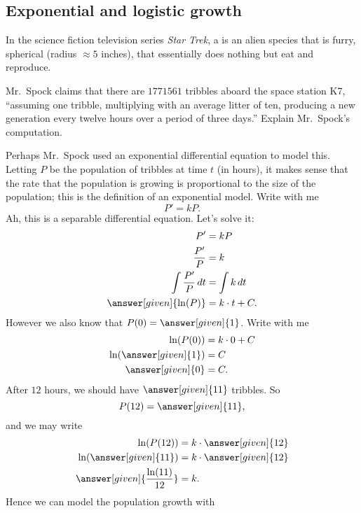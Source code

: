 \documentclass{ximera}
\begin{document}
\subsection{Exponential and logistic growth}

In the science fiction television series \textit{Star
  Trek}, a  is an alien species that is furry, spherical
(radius $\approx 5$ inches), that essentially does nothing but eat and
reproduce. 

\begin{example}
  Mr.\ Spock claims that there are $1771561$ tribbles aboard the space
  station K7, ``assuming one tribble, multiplying with an average
  litter of ten, producing a new generation every twelve hours over a
  period of three days.'' Explain Mr.\ Spock's computation.
  \begin{explanation}
    Perhaps Mr.\ Spock used an exponential differential equation to
    model this.  Letting $P$ be the population of tribbles at time $t$
    (in hours), it makes sense that the rate that the population is
    growing is proportional to the size of the population; this is the
    definition of an exponential model. Write with me
    \[
    P' = k P.
    \]
    Ah, this is a separable differential equation. Let's solve it:
    \begin{align*}
      P' &= k P\\
      \frac{P'}{P} &= k\\
      \int \frac{P'}{P} \d t &= \int k\d t\\
      \answer[given]{\ln(P)} &= k\cdot t + C.
    \end{align*}
    However we also know that $P(0) = \answer[given]{1}$. Write with me
    \begin{align*}
      \ln(P(0)) &= k\cdot 0 + C\\
      \ln(\answer[given]{1}) &= C\\
      \answer[given]{0} &=C.
    \end{align*}
    After $12$ hours, we should have $\answer[given]{11}$ tribbles. So 
    \[
    P(12) = \answer[given]{11},
    \]
    and we may write
    \begin{align*}
      \ln(P(12)) &= k\cdot \answer[given]{12}\\
    \ln(\answer[given]{11}) &= k\cdot \answer[given]{12}\\
    \answer[given]{\frac{\ln(11)}{12}} &= k.
    \end{align*}
    Hence we can model the population growth with

\end{explanation}
\end{example}
\end{document}
